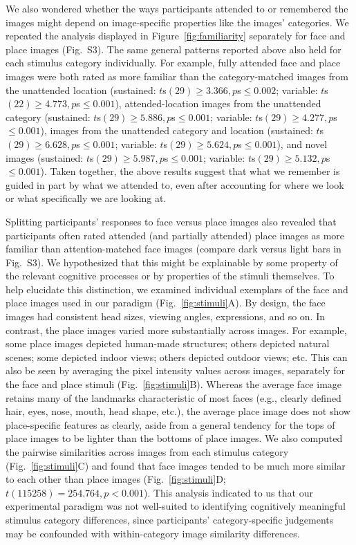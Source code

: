 \documentclass[english]{article}
\newcommand{\ratingsByCategory}{S3}
\begin{document}
We also wondered whether the ways participants attended to or remembered the
images might depend on image-specific properties like the images' categories.
We repeated the analysis displayed in Figure~\ref{fig:familiarity} separately
for face and place images (Fig.~\ratingsByCategory). The same general patterns
reported above also held for each stimulus category individually. For example,
fully attended face and place images were both rated as more familiar than the
category-matched images from the unattended location (sustained: $t$s$(29) \geq
3.366, p$s$ \leq 0.002$; variable: $t$s$(22) \geq 4.773, p$s$ \leq 0.001$),
attended-location images from the unattended category (sustained: $t$s$(29)
\geq 5.886, p$s$ \leq 0.001$; variable: $t$s$(29) \geq 4.277, p$s$ \leq
0.001$), images from the unattended category and location (sustained: $t$s$(29)
\geq 6.628, p$s$ \leq 0.001$; variable: $t$s$(29) \geq 5.624, p$s$ \leq
0.001$), and novel images (sustained: $t$s$(29) \geq 5.987, p$s$ \leq 0.001$;
variable: $t$s$(29) \geq 5.132, p$s$ \leq 0.001$). Taken together, the above
results suggest that what we remember is guided in part by what we attended to,
even after accounting for where we look or what specifically we are looking at.

Splitting participants' responses to face versus place images also revealed
that participants often rated attended (and partially attended) place images as
more familiar than attention-matched face images (compare dark versus light
bars in Fig.~\ratingsByCategory). We hypothesized that this might be
explainable by some property of the relevant cognitive processes or by
properties of the stimuli themselves. To help elucidate this distinction, we
examined individual exemplars of the face and place images used in our paradigm
(Fig.~\ref{fig:stimuli}A). By design, the face images had consistent head
sizes, viewing angles, expressions, and so on. In contrast, the place images
varied more substantially across images. For example, some place images
depicted human-made structures; others depicted natural scenes; some depicted
indoor views; others depicted outdoor views; etc. This can also be seen by
averaging the pixel intensity values across images, separately for the face and
place stimuli (Fig.~\ref{fig:stimuli}B). Whereas the average face image retains
many of the landmarks characteristic of most faces (e.g., clearly defined hair,
eyes, nose, mouth, head shape, etc.), the average place image does not show
place-specific features as clearly, aside from a general tendency for the tops
of place images to be lighter than the bottoms of place images. We also
computed the pairwise similarities across images from each stimulus category
(Fig.~\ref{fig:stimuli}C) and found that face images tended to be much more
similar to each other than place images (Fig.~\ref{fig:stimuli}D; $t(115258) =
254.764, p < 0.001$). This analysis indicated to us that our experimental
paradigm was not well-suited to identifying cognitively meaningful stimulus
category differences, since participants' category-specific judgements may be
confounded with within-category image similarity differences.
\end{document}
